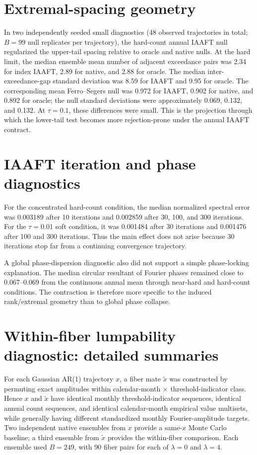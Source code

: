 \documentclass[11pt]{article}
\begin{document}
\section{Extremal-spacing geometry}
In two independently seeded small diagnostics (48 observed trajectories in total; $B=99$ null replicates per trajectory), the hard-count annual IAAFT null regularized the upper-tail spacing relative to oracle and native nulls. At the hard limit, the median ensemble mean number of adjacent exceedance pairs was 2.34 for index IAAFT, 2.89 for native, and 2.88 for oracle. The median inter-exceedance-gap standard deviation was 8.59 for IAAFT and 9.95 for oracle. The corresponding mean Ferro--Segers null was 0.972 for IAAFT, 0.902 for native, and 0.892 for oracle; the null standard deviations were approximately 0.069, 0.132, and 0.132. At $\tau=0.1$, these differences were small. This is the projection through which the lower-tail test becomes more rejection-prone under the annual IAAFT contract.

\section{IAAFT iteration and phase diagnostics}
For the concentrated hard-count condition, the median normalized spectral error was 0.003189 after 10 iterations and 0.002859 after 30, 100, and 300 iterations. For the $\tau=0.01$ soft condition, it was 0.001484 after 30 iterations and 0.001476 after 100 and 300 iterations. Thus the main effect does not arise because 30 iterations stop far from a continuing convergence trajectory.

A global phase-dispersion diagnostic also did not support a simple phase-locking explanation. The median circular resultant of Fourier phases remained close to 0.067--0.069 from the continuous annual mean through near-hard and hard-count conditions. The contraction is therefore more specific to the induced rank/extremal geometry than to global phase collapse.

\section{Within-fiber lumpability diagnostic: detailed summaries}
For each Gaussian AR(1) trajectory $x$, a fiber mate $\widetilde x$ was constructed by permuting exact amplitudes within calendar-month $\times$ threshold-indicator class. Hence $x$ and $\widetilde x$ have identical monthly threshold-indicator sequences, identical annual count sequences, and identical calendar-month empirical value multisets, while generally having different standardized monthly Fourier-amplitude targets. Two independent native ensembles from $x$ provide a same-$x$ Monte Carlo baseline; a third ensemble from $\widetilde x$ provides the within-fiber comparison. Each ensemble used $B=249$, with 90 fiber pairs for each of $\lambda=0$ and $\lambda=4$.
\end{document}
